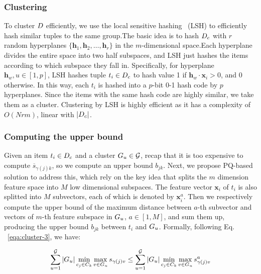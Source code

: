 \subsubsection{Clustering}
\label{subsec:clustering}
To cluster $D$ efficiently,  we use the local sensitive hashing~\cite{} (LSH) to efficiently hash similar tuples to the same group.The basic idea  is to hash $D_c$ with $r$ random hyperplanes $\{\mathbf{h}_1, \mathbf{h}_2, \dots, \mathbf{h}_r\}$ in the  $m$-dimensional space.Each hyperplane divides the entire space into two half subspaces, and LSH just hashes the  items according to which subspace they fall in. Specifically, for  hyperplane $\mathbf{h}_w, u\in[1,p]$, LSH hashes tuple $t_i\in D_c$ to hash value 1 if $\mathbf{h}_w \cdot \mathbf{x}_i> 0$, and 0 otherwise.
In this way, each $t_i$ is hashed into a $p$-bit 0-1 hash code by $p$ hyperplanes.
Since the items with the same hash code are highly similar, we take them as a cluster.
Clustering by LSH is highly efficient as it has a complexity of  $O(Nrm)$, linear with $|D_c|$. 

\subsubsection{Computing the upper bound}

Given an item $t_i\in D_c$ and a cluster $G_u \in \mathcal{G}$, recap that it is too expensive to  compute $\overline{s}_{\gamma(j)k}$, so we compute an upper bound $b_{jk}$. Next, we propose PQ-based solution to address this, which rely on the key idea that splits the $m$ dimension feature space into $M$ low dimensional subspaces. The feature vector $\mathbf{x}_i$ of  $t_i$ is also splitted into $M$ subvectors, each of which is denoted by $\mathbf{x}^a_i$. 
Then we respectively compute the upper bound of the maximum distance between $a$-th subvector and vectors of $m$-th feature subspace in $G_u$, $a\in [1,M]$, and sum them up, producing the upper bound $b_{jk}$ between $t_i$ and $G_u$. Formally, following Eq. ~\ref{eqa:cluster-3}, we have:

\begin{equation}\label{eqa:cluster-5}
    \begin{aligned}
    \sum_{u=1}^{\mathcal{G}} |G_u| \min_{c_j\in C_k} \max_{v \in G_u} s_{\gamma(j)v} \leq\sum_{u=1}^{\mathcal{G}} |G_u| \min_{c_j\in C_k} \max_{v \in G_u} s^a_{\gamma(j)v}
    \end{aligned}
\end{equation}

